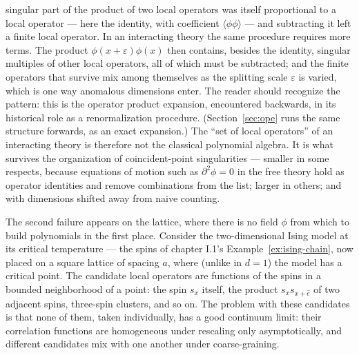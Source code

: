singular part of the product of two local operators was itself proportional
to a local operator --- here the identity, with coefficient
$\langle\phi\phi\rangle$ --- and subtracting it left a finite local operator.
In an interacting theory the same procedure requires more terms. The product
$\phi(x+\varepsilon)\phi(x)$ then contains, besides the identity, singular
multiples of other local operators, all of which must be subtracted; and the
finite operators that survive mix among themselves as the splitting scale
$\varepsilon$ is varied, which is one way anomalous dimensions enter. The
reader should recognize the pattern: this is the operator product expansion,
encountered backwards, in its historical role as a renormalization
procedure. (Section~\ref{sec:ope} runs the same structure forwards, as an
exact expansion.) The ``set of local operators'' of an interacting theory is
therefore not the classical polynomial algebra. It is what survives the
organization of coincident-point singularities --- smaller in some respects,
because equations of motion such as $\partial^2 \phi = 0$ in the free theory
hold as operator identities and remove combinations from the list; larger in
others; and with dimensions shifted away from naive counting.

The second failure appears on the lattice, where there is no field $\phi$
from which to build polynomials in the first place. Consider the
two-dimensional Ising model at its critical temperature --- the spins of
chapter I.1's Example~\ref{ex:ising-chain}, now placed on a square lattice of
spacing $a$, where (unlike in $d = 1$) the model has a critical
point. The candidate local operators are functions of the spins in a bounded
neighborhood of a point: the spin $s_x$ itself, the product $s_x s_{x +
\hat e}$ of two adjacent spins, three-spin clusters, and so on. The problem
with these candidates is that none of them, taken individually, has a good
continuum limit: their correlation functions are homogeneous under rescaling
only asymptotically, and different candidates mix with one another under
coarse-graining.

